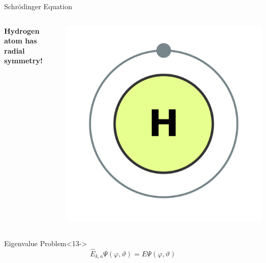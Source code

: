 \documentclass[xetex, onlymath, aspectratio=169]{beamer}
\begin{document}
\begin{frame}{Schrödinger Equation}
{\begin{columns}
\begin{column}{.6\linewidth}
  			{\bfseries Hydrogen atom has radial symmetry!}
  		\end{column}
  		\begin{column}{.35\linewidth}
      	\includegraphics[width=\linewidth]{figures/hydrogen}
  			\nocite{depiep_electron_2013}
  		\end{column}
  	\end{columns}
	}

	\begin{alertblock}{Eigenvalue Problem}<13->
		\[
			\hat{E}_{k,a} \Psi(\varphi, \vartheta) = E \Psi(\varphi, \vartheta)
		\]
	\end{alertblock}
\end{frame}
\end{document}

